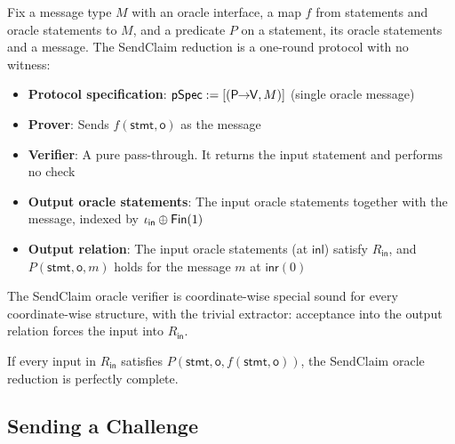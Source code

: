 \begin{definition}
    \label{def:sendclaim_oracle_reduction}
    Fix a message type $M$ with an oracle interface, a map $f$ from statements and oracle statements to $M$, and a predicate $P$ on a statement, its oracle statements and a message. The SendClaim reduction is a one-round protocol with no witness:
    \begin{itemize}
        \item \textbf{Protocol specification}: $\mathsf{pSpec} := [(\mathsf{P \!\!\rightarrow\!\! V}, M)]$ (single oracle message)
        \item \textbf{Prover}: Sends $f(\mathsf{stmt}, \mathsf{o})$ as the message
        \item \textbf{Verifier}: A pure pass-through. It returns the input statement and performs no check
        \item \textbf{Output oracle statements}: The input oracle statements together with the message, indexed by $\iota_{\mathsf{in}} \oplus \mathsf{Fin}(1)$
        \item \textbf{Output relation}: The input oracle statements (at $\mathsf{inl}$) satisfy $R_{\mathsf{in}}$, and $P(\mathsf{stmt}, \mathsf{o}, m)$ holds for the message $m$ at $\mathsf{inr}(0)$
    \end{itemize}
    \leanok
\end{definition}

\begin{theorem}
    The SendClaim oracle verifier is coordinate-wise special sound for every coordinate-wise structure, with the trivial extractor: acceptance into the output relation forces the input into $R_{\mathsf{in}}$.
    \leanok
\end{theorem}

\begin{theorem}
    If every input in $R_{\mathsf{in}}$ satisfies $P(\mathsf{stmt}, \mathsf{o}, f(\mathsf{stmt}, \mathsf{o}))$, the SendClaim oracle reduction is perfectly complete.
\end{theorem}

\subsection{Sending a Challenge}

